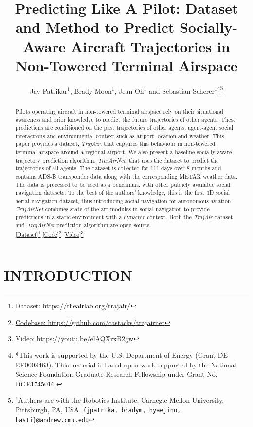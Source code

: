 \documentclass[letterpaper, 10 pt, conference]{ieeeconf}
\title{\LARGE \bf
Predicting Like A Pilot: Dataset and Method to Predict Socially-Aware Aircraft Trajectories in Non-Towered Terminal Airspace
}
\author{Jay Patrikar$^{1}$, Brady Moon$^{1}$, Jean Oh$^{1}$ and Sebastian Scherer$^{1}$\thanks{*This work is supported by the U.S. Department of Energy (Grant DE-EE0008463). This material is based upon work supported by the National Science Foundation Graduate Research Fellowship under Grant No. DGE1745016.}\thanks{$^{1}$Authors are with the Robotics Institute, Carnegie Mellon University, Pittsburgh, PA, USA.
        {\tt\small \{jpatrika, bradym, hyaejino, basti\}@andrew.cmu.edu}}}
\begin{document}
\maketitle
\thispagestyle{empty}
\pagestyle{empty}


\begin{abstract}

Pilots operating aircraft in non-towered terminal airspace rely on their situational awareness and prior knowledge to predict the future trajectories of other agents. These predictions are conditioned on the past trajectories of other agents, agent-agent social interactions and environmental context such as airport location and weather. This paper provides a dataset, \textit{TrajAir}, that captures this behaviour in non-towered terminal airspace around a regional airport. We also present a baseline socially-aware trajectory prediction algorithm, \textit{TrajAirNet}, that uses the dataset to predict the trajectories of all agents. The dataset is collected for 111 days over 8 months and contains ADS-B transponder data along with the corresponding METAR weather data. The data is processed to be used as a benchmark with other publicly available social navigation datasets. To the best of the authors' knowledge, this is the first 3D social aerial navigation dataset, thus introducing social navigation for autonomous aviation. \textit{TrajAirNet} combines state-of-the-art modules in social navigation to provide predictions in a static environment with a dynamic context. Both the \textit{TrajAir} dataset and \textit{TrajAirNet} prediction algorithm are open-source.\\ \href{https://theairlab.org/trajair/}{[Dataset]}\footnote{\href{https://theairlab.org/trajair/}{Dataset: https://theairlab.org/trajair/}} \href{https://github.com/castacks/trajairnet}{[Code]}\footnote{ \href{https://github.com/castacks/trajairnet}{Codebase: https://github.com/castacks/trajairnet}}  
\href{https://youtu.be/elAQXrxB2gw}{[Video]}\footnote{ \href{https://youtu.be/elAQXrxB2gw}{Video: https://youtu.be/elAQXrxB2gw}}  

\end{abstract}


\section{INTRODUCTION}
\end{document}

